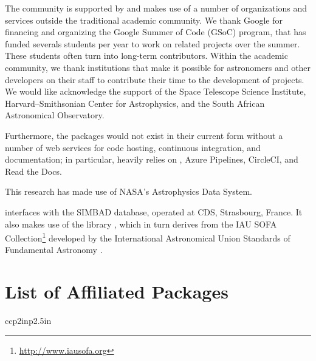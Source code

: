 \documentclass[modern]{aastex631}
\begin{document}
The \astropy community is supported by and makes use of a number of
organizations and services outside the traditional academic community.
We thank Google for financing and organizing the
Google Summer of Code (GSoC) program, that has funded severals
students per year to work on \astropy related projects over the
summer. These students often turn into long-term contributors.
Within the academic community, we thank institutions that make it possible for
astronomers and other developers on their staff to contribute their time to the
development of \astropy projects.
We would like acknowledge the support of the Space Telescope Science Institute,
Harvard--Smithsonian Center for Astrophysics, and the South African Astronomical
Observatory.

Furthermore, the \astropy packages would not exist in their current form without
a number of web services for code hosting, continuous integration, and
documentation; in particular, \astropy heavily relies on \github, Azure
Pipelines, CircleCI, and Read the Docs.

This research has made use of NASA's Astrophysics Data System.

\astropypkg interfaces with the SIMBAD database, operated at CDS, Strasbourg,
France. It also makes use of the  library \citep{erfa}, which in turn
derives from the IAU SOFA Collection\footnote{\url{http://www.iausofa.org}}
developed by the International Astronomical Union Standards of Fundamental
Astronomy \citep{sofa}.






\appendix

\section{List of Affiliated Packages}

\begin{longrotatetable}
    \begin{deluxetable*}{ccp{2in}p{2.5in}}
    \label{tab:affiliated-registry}
      \startdata
        
      \enddata
  \end{deluxetable*}
\end{longrotatetable}
\end{document}
